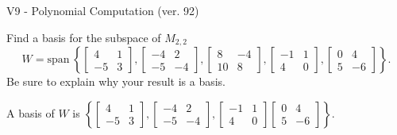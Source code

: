 \begin{exercise}
  \begin{exerciseTitle}V9 - Polynomial Computation (ver. 92)\end{exerciseTitle}
  \begin{exerciseStatement}
    Find a basis for the subspace of \(M_{2,2}\) 
\[W=\mathrm{span}\ \left\{\left[\begin{array}{cc}
4 & 1 \\
-5 & 3
\end{array}\right] , \left[\begin{array}{cc}
-4 & 2 \\
-5 & -4
\end{array}\right] , \left[\begin{array}{cc}
8 & -4 \\
10 & 8
\end{array}\right] , \left[\begin{array}{cc}
-1 & 1 \\
4 & 0
\end{array}\right] , \left[\begin{array}{cc}
0 & 4 \\
5 & -6
\end{array}\right]\right\}.\]
 Be sure to explain why your result is a basis.


  \end{exerciseStatement}
  \begin{exerciseAnswer}
   A basis of \(W\) is  \(\left\{\left[\begin{array}{cc}
4 & 1 \\
-5 & 3
\end{array}\right] , \left[\begin{array}{cc}
-4 & 2 \\
-5 & -4
\end{array}\right] , \left[\begin{array}{cc}
-1 & 1 \\
4 & 0
\end{array}\right] \left[\begin{array}{cc}
0 & 4 \\
5 & -6
\end{array}\right]\right\}\).
  


  \end{exerciseAnswer}
\end{exercise}